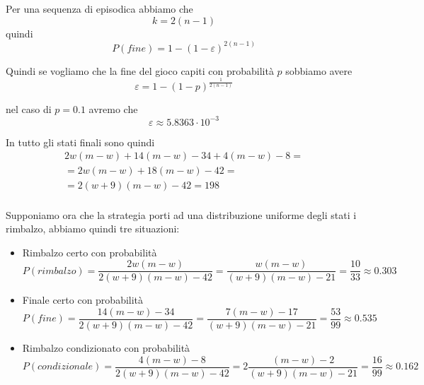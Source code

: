 \documentclass[a4paper,11pt]{article}
\begin{document}
Per una sequenza di episodica abbiamo che \[ k = 2(n-1) \] quindi
\[
P(fine) = 1 - (1 - \varepsilon) ^ {2(n-1)}
\]

Quindi se vogliamo che la fine del gioco capiti con probabilità $ p $ sobbiamo avere
\[
\varepsilon = 1- (1 - p) ^ \frac{1}{2(n-1)}
\]

nel caso di $ p = 0.1 $ avremo che 
\[
\varepsilon \approx 5.8363 \cdot 10^{-3}
\]

In tutto gli stati finali sono quindi 
\[
\begin{array}{r}
 2w(m-w)+14(m-w)-34+4(m-w)-8= \\
 =2w(m-w)+18(m-w)-42= \\
 =2(w+9)(m-w)-42= 198\\
\end{array}
\]

Supponiamo ora che la strategia porti ad una distribuzione uniforme degli stati i rimbalzo, abbiamo quindi tre situazioni:

\begin{itemize}
	\item 	
	Rimbalzo certo con probabilità
	 \[ P(rimbalzo)=\frac{2w(m-w)}{2(w+9)(m-w)-42}
	 =\frac{w(m-w)}{(w+9)(m-w)-21}
	 = \frac{10}{33}\approx0.303
	 \]

	\item 	
	Finale certo con probabilità 
	 \[ P(fine)=\frac{14(m-w)-34}{2(w+9)(m-w)-42}
	 =\frac{7(m-w)-17}{(w+9)(m-w)-21}
	 = \frac{53}{99}\approx0.535
	 \]
	 
	 \item 	
	 Rimbalzo condizionato con probabilità 
	 \[ P(condizionale)=\frac{4(m-w)-8}{2(w+9)(m-w)-42}
	 =2\frac{(m-w)-2}{(w+9)(m-w)-21}
	 = \frac{16}{99}\approx0.162
	 \]
\end{itemize}
\end{document}
